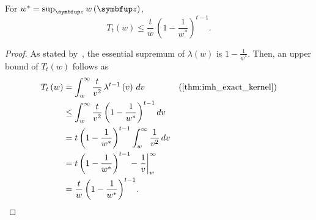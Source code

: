 
\begin{lemma}\label{thm:tn_bound}
  For \(w^* = \sup_{\vz} w\left(\vz\right) \), 
  \[
  T_t\left( w \right) \leq \frac{t}{w} \, {\left(1 - \frac{1}{w^*}\right)}^{t-1}.
  \]
\end{lemma}
\begin{proof}
  As stated by~\citet{Smith96exacttransition}, the essential supremum of \(\lambda\left(w\right)\) is \(1 - \frac{1}{w^*}\).
  Then, an upper bound of \(T_t\left(w\right)\) follows as
  \begin{alignat}{2}
    T_t\left(w\right) 
    &= \int_w^{\infty} \frac{t}{v^2} \, \lambda^{t-1}\left(v\right)\,dv
    && \text{(\cref{thm:imh_exact_kernel})}
    \\
    &\leq \int_w^{\infty} \frac{t}{v^2} \, {\left(1 - \frac{1}{w^*}\right)}^{t-1}\,dv
    \\
    &= t \, {\left(1 - \frac{1}{w^*}\right)}^{t-1}  \int_w^{\infty} \frac{1}{v^2} \,dv
    \\
    &= t \, {\left(1 - \frac{1}{w^*}\right)}^{t-1}  {-\left.\frac{1}{v}\right\rvert^{\infty}_{w}}
    \\
    &= \frac{t}{w} \, {\left(1 - \frac{1}{w^*}\right)}^{t-1}.
  \end{alignat}
\end{proof}

